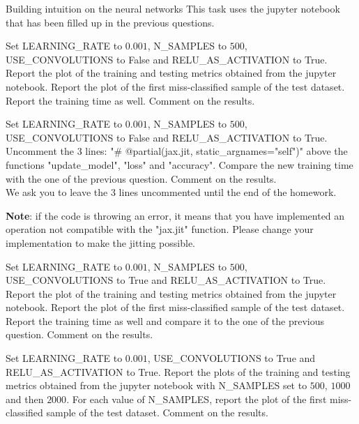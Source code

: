\documentclass[
	ngerman,
	points=true,%
    solution=true,
    accentcolor=9c,
    colorbacktitle
	]{tudaexercise}
\begin{document}
\begin{task}{Building intuition on the neural networks}
This task uses the jupyter notebook that has been filled up in the previous questions.
\begin{subtask}
    Set LEARNING\_RATE to $0.001$, N\_SAMPLES to $500$, USE\_CONVOLUTIONS to False and RELU\_AS\_ACTIVATION to True. Report the plot of the training and testing metrics obtained from the jupyter notebook. Report the plot of the first miss-classified sample of the test dataset. Report the training time as well. Comment on the results.
\end{subtask}
\begin{solution}

\end{solution}

\begin{subtask}
    Set LEARNING\_RATE to $0.001$, N\_SAMPLES to $500$, USE\_CONVOLUTIONS to False and RELU\_AS\_ACTIVATION to True. Uncomment the 3 lines: "\# @partial(jax.jit, static\_argnames="self")" above the functions "update\_model", "loss" and "accuracy". Compare the new training time with the one of the previous question. Comment on the results.\\
    We ask you to leave the 3 lines uncommented until the end of the homework.
    
    \textbf{Note}: if the code is throwing an error, it means that you have implemented an operation not compatible with the "jax.jit" function. Please change your implementation to make the jitting possible.
\end{subtask}
\begin{solution}

\end{solution}

\begin{subtask}
    Set LEARNING\_RATE to $0.001$, N\_SAMPLES to $500$, USE\_CONVOLUTIONS to True and RELU\_AS\_ACTIVATION to True. Report the plot of the training and testing metrics obtained from the jupyter notebook. Report the plot of the first miss-classified sample of the test dataset. Report the training time as well and compare it to the one of the previous question. Comment on the results.
\end{subtask}
\begin{solution}

\end{solution}

\begin{subtask}
    Set LEARNING\_RATE to $0.001$, USE\_CONVOLUTIONS to True and RELU\_AS\_ACTIVATION to True. Report the plots of the training and testing metrics obtained from the jupyter notebook with N\_SAMPLES set to $500$, $1000$ and then $2000$. For each value of N\_SAMPLES, report the plot of the first miss-classified sample of the test dataset. Comment on the results.
\end{subtask}
\begin{solution}


\end{solution}
\end{task}
\end{document}
